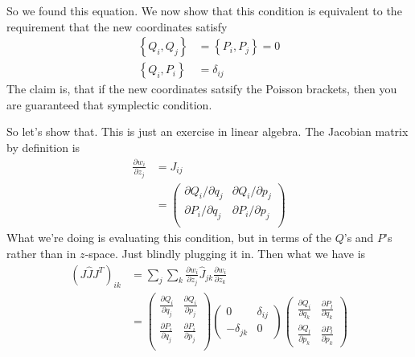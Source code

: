 So we found this equation.
We now show that this condition is equivalent to the requirement that the new
coordinates satisfy
\begin{align}
    \left\{ 
    Q_i, Q_j
    \right\}
    &=
    \left\{ 
    P_i, P_j
    \right\}
    = 0\\
    \left\{ 
    Q_i, P_i
    \right\}
    &=
    \delta_{ij}
\end{align}
The claim is,
that if the new coordinates satsify the Poisson brackets,
then you are guaranteed that symplectic condition.

So let's show that.
This is just an exercise in linear algebra.
The Jacobian matrix by definition is
\begin{align}
    \frac{\partial w_i}{\partial z_j} &=
    J_{ij}\\
    &=
    \begin{pmatrix}
        \partial Q_i/ \partial q_j & \partial Q_i / \partial p_j\\
        \partial P_i/ \partial q_j & \partial P_i / \partial p_j\\
    \end{pmatrix}
\end{align}
What we're doing is evaluating this condition,
but in terms of the $Q$'s and $P$'s rather than in $z$-space.
Just blindly plugging it in.
Then what we have is
\begin{align}
    \left( J \hat{J} J^T \right)_{ik} &=
    \sum_{j} \sum_{k}
    \frac{\partial w_i}{\partial z_j}
    \hat{J}_{jk}
    \frac{\partial w_i}{\partial z_k}\\
    &=
    \begin{pmatrix}
        \frac{\partial Q_i}{\partial q_j} &
        \frac{\partial Q_i}{\partial p_j}\\
        \frac{\partial P_i}{\partial q_j} &
        \frac{\partial P_i}{\partial p_j}\\
    \end{pmatrix}
    \begin{pmatrix}
        0 & \delta_{ij}\\
        - \delta_{jk} & 0
    \end{pmatrix}
    \begin{pmatrix}
        \frac{\partial Q_i}{\partial q_k} &
        \frac{\partial P_l}{\partial q_k}\\
        \frac{\partial Q_l}{\partial p_k} &
        \frac{\partial P_l}{\partial p_k}
    \end{pmatrix}
\end{align}
